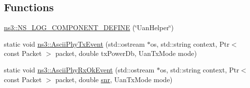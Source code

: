 \subsection*{Functions}
\begin{DoxyCompactItemize}
\item 
\hyperlink{namespacens3_a1084854b4fbcd41292bfc0a6e7bc1dcb}{ns3\+::\+N\+S\+\_\+\+L\+O\+G\+\_\+\+C\+O\+M\+P\+O\+N\+E\+N\+T\+\_\+\+D\+E\+F\+I\+NE} (\char`\"{}Uan\+Helper\char`\"{})
\item 
static void \hyperlink{namespacens3_a79a544da2f3466026b671955e8f9d863}{ns3\+::\+Ascii\+Phy\+Tx\+Event} (std\+::ostream $\ast$os, std\+::string context, Ptr$<$ const Packet $>$ packet, double tx\+Power\+Db, Uan\+Tx\+Mode mode)
\item 
static void \hyperlink{namespacens3_a635a3c90314150e7526c9d6a5cf56a6e}{ns3\+::\+Ascii\+Phy\+Rx\+Ok\+Event} (std\+::ostream $\ast$os, std\+::string context, Ptr$<$ const Packet $>$ packet, double \hyperlink{lte__pathloss_8m_ae6e82a215dff6b79fb6e9952a1b78453}{snr}, Uan\+Tx\+Mode mode)
\end{DoxyCompactItemize}
